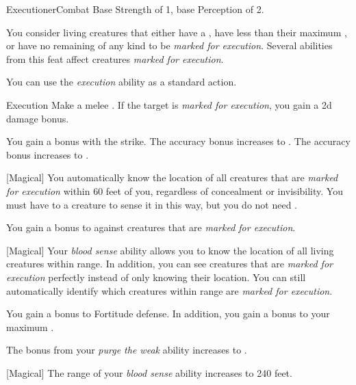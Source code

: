     \begin{feat}{Executioner}{Combat}
        \featpres Base Strength of 1, base Perception of 2.

         You consider living creatures that either have a , have less than their maximum , or have no remaining  of any kind to be \textit{marked for execution}.
        Several abilities from this feat affect creatures \textit{marked for execution}.

         You can use the \textit{execution} ability as a standard action.
        \begin{freeability}{Execution}
            Make a melee .
            If the target is \textit{marked for execution}, you gain a \plus2d damage bonus.

            \rankline
             You gain a   bonus with the strike.
             The accuracy bonus increases to .
             The accuracy bonus increases to .
        \end{freeability}

        [Magical] You automatically know the location of all creatures that are \textit{marked for execution} within 60 feet of you, regardless of concealment or invisibility.
        You must have  to a creature to sense it in this way, but you do not need .

         You gain a  bonus to  against creatures that are \textit{marked for execution}.

        [Magical] Your \textit{blood sense} ability allows you to know the location of all living creatures within range.
        In addition, you can see creatures that are \textit{marked for execution} perfectly instead of only knowing their location.
        You can still automatically identify which creatures within range are \textit{marked for execution}.

         You gain a  bonus to Fortitude defense.
        In addition, you gain a  bonus to your maximum .

         The bonus from your \textit{purge the weak} ability increases to .

        [Magical] The range of your \textit{blood sense} ability increases to 240 feet.
    \end{feat}

